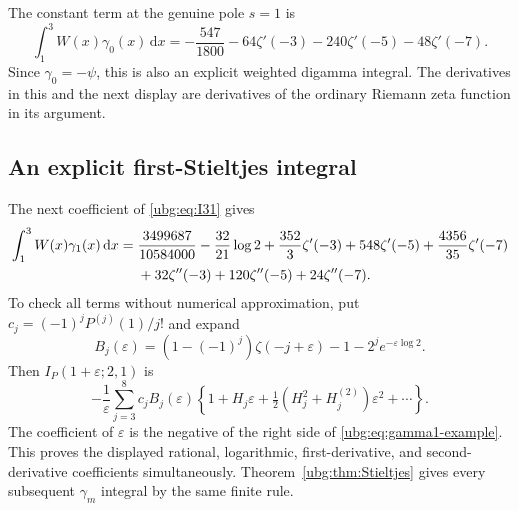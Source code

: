 \documentclass[11pt,letterpaper]{article}
\numberwithin{equation}{section}
\theoremstyle{definition}\newtheorem{definition}[theorem]{Definition}
\theoremstyle{remark}\newtheorem{remark}[theorem]{Remark}
\newcommand{\dd}{\,\mathrm d}\newcommand{\ii}{\mathrm i}
\begin{document}
The constant term at the genuine pole $s=1$ is
\begin{equation}\label{ubg:eq:gamma0-example}
 \boxed{\displaystyle
 \int_1^3W(x)\gamma_0(x)\dd x
 =-\frac{547}{1800}-64\zeta'(-3)-240\zeta'(-5)-48\zeta'(-7).}
\end{equation}
Since $\gamma_0=-\psi$, this is also an explicit weighted digamma
integral. The derivatives in this and the next display are derivatives
of the ordinary Riemann zeta function in its argument.

\subsection{An explicit first-Stieltjes integral}
The next coefficient of \eqref{ubg:eq:I31} gives
\begin{align}
 \int_1^3W(x)\gamma_1(x)\dd x
 ={}&\frac{3499687}{10584000}-\frac{32}{21}\log2
       +\frac{352}{3}\zeta'(-3)+548\zeta'(-5)
                       +\frac{4356}{35}\zeta'(-7)\notag\\
   &+32\zeta''(-3)+120\zeta''(-5)+24\zeta''(-7).
 \label{ubg:eq:gamma1-example}
\end{align}
To check all terms without numerical approximation, put
$c_j=(-1)^jP^{(j)}(1)/j!$ and expand
\[
 B_j(\varepsilon)=(1-(-1)^j)\zeta(-j+\varepsilon)
                               -1-2^je^{-\varepsilon\log2}.
\]
Then $I_P(1+\varepsilon;2,1)$ is
\[
 -\frac1\varepsilon\sum_{j=3}^8c_j B_j(\varepsilon)
             \left\{1+H_j\varepsilon
                  +\tfrac12(H_j^2+H_j^{(2)})\varepsilon^2+\cdots\right\}.
\]
The coefficient of $\varepsilon$ is the negative of the right side
of \eqref{ubg:eq:gamma1-example}. This proves the displayed rational,
logarithmic, first-derivative, and second-derivative coefficients
simultaneously. Theorem~\ref{ubg:thm:Stieltjes} gives every subsequent
$\gamma_m$ integral by the same finite rule.
\end{document}
